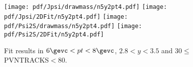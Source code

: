 \begin{figure}[H]
\begin{center}
\texttt{[image: pdf/Jpsi/drawmass/n5y2pt4.pdf]}
\texttt{[image: pdf/Jpsi/2DFit/n5y2pt4.pdf]}
\vspace*{-0.5cm}
\texttt{[image: pdf/Psi2S/drawmass/n5y2pt4.pdf]}
\texttt{[image: pdf/Psi2S/2DFit/n5y2pt4.pdf]}
\vspace*{-0.5cm}
\end{center}
\caption{Fit results in $6\gevc<pt<8\gevc$, $2.8<y<3.5$ and 30$\leq$PVNTRACKS$<$80.}
\label{Fitn5y2pt4}
\end{figure}
